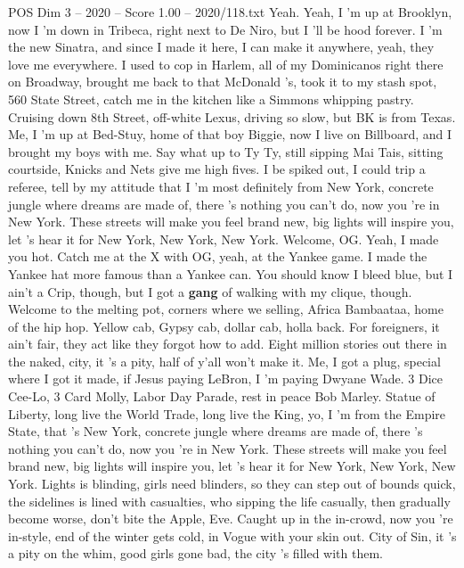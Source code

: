 \begin{textsample}{POS Dim 3 – 2020 – Score 1.00 – 2020/118.txt}  \label{ex:f3_pos_014}
Yeah.
Yeah, I 'm up at Brooklyn, now I 'm down in Tribeca, right next to De Niro, but I 'll be hood forever.
I 'm the new Sinatra, and since I made it here, I can make it anywhere, yeah, they love me everywhere.
I used to cop in Harlem, all of my Dominicanos right there on Broadway, brought me back to that McDonald 's, took it to my stash spot, 560 State Street, catch me in the kitchen like a Simmons whipping pastry.
Cruising down 8th Street, off-white Lexus, driving so slow, but BK is from Texas.
Me, I 'm up at Bed-Stuy, home of that boy Biggie, now I live on Billboard, and I brought my boys with me.
Say what up to Ty Ty, still sipping Mai Tais, sitting courtside, Knicks and Nets give me high fives.
I be spiked out, I could trip a referee, tell by my attitude that I 'm most definitely from New York, concrete jungle where dreams are made of, there 's nothing you can't do, now you 're in New York.
These streets will make you feel brand new, big lights will inspire you, let 's hear it for New York, New York, New York.
Welcome, OG.
Yeah, I made you hot.
Catch me at the X with OG, yeah, at the Yankee game.
I made the Yankee hat more famous than a Yankee can.
You should know I bleed blue, but I ain't a Crip, though, but I got a \textbf{gang} of walking with my clique, though.
Welcome to the melting pot, corners where we selling, Africa Bambaataa, home of the hip hop.
Yellow cab, Gypsy cab, dollar cab, holla back.
For foreigners, it ain't fair, they act like they forgot how to add.
Eight million stories out there in the naked, city, it 's a pity, half of y'all won't make it.
Me, I got a plug, special where I got it made, if Jesus paying LeBron, I 'm paying Dwyane Wade. 3 Dice Cee-Lo, 3 Card Molly, Labor Day Parade, rest in peace Bob Marley.
Statue of Liberty, long live the World Trade, long live the King, yo, I 'm from the Empire State, that 's New York, concrete jungle where dreams are made of, there 's nothing you can't do, now you 're in New York.
These streets will make you feel brand new, big lights will inspire you, let 's hear it for New York, New York, New York.
Lights is blinding, girls need blinders, so they can step out of bounds quick, the sidelines is lined with casualties, who sipping the life casually, then gradually become worse, don't bite the Apple, Eve.
Caught up in the in-crowd, now you 're in-style, end of the winter gets cold, in Vogue with your skin out.
City of Sin, it 's a pity on the whim, good girls gone bad, the city 's filled with them.

\end{textsample}

